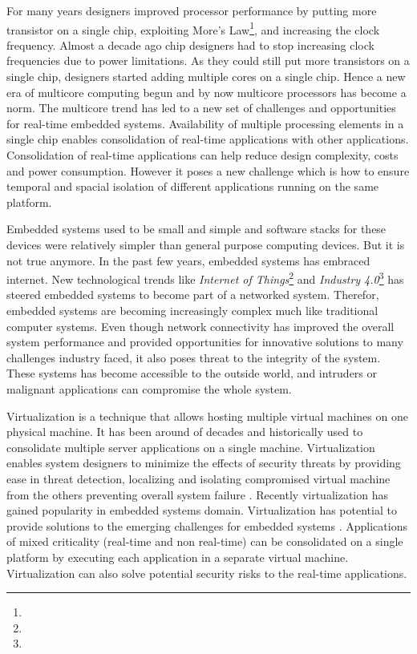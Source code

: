 For many years designers improved processor performance by putting more transistor on a single chip, exploiting More's Law\footnote{\moreslaw}, and increasing the clock frequency.
Almost a decade ago chip designers had to stop increasing clock frequencies due to power limitations.
As they could still put more transistors on a single chip, designers started adding multiple cores on a single chip.
Hence a new era of multicore computing begun and by now multicore processors has become a norm.
The multicore trend has led to a new set of challenges and opportunities for real-time embedded systems.
Availability of multiple processing elements in a single chip enables consolidation of real-time applications with other applications.
Consolidation of real-time applications can help reduce design complexity, costs and power consumption.
However it poses a new challenge which is how to ensure temporal and spacial isolation of different applications running on the same platform.

Embedded systems used to be small and simple and software stacks for these devices were relatively simpler
than general purpose computing devices. But it is not true anymore.
In the past few years, embedded systems has embraced internet. New technological trends like \emph{Internet of Things}\footnote{\IoT} and \emph{Industry 4.0}\footnote{\industry}
has steered embedded systems to become part of a networked system.
Therefor, embedded systems are becoming increasingly complex much like traditional computer systems.
Even though network connectivity has improved the overall system performance and provided opportunities for innovative solutions to many challenges industry faced,
it also poses threat to the integrity of the system.
These systems has become accessible to the outside world, and intruders or malignant applications can compromise the whole system.

Virtualization is a technique that allows hosting multiple virtual machines on one physical machine. 
It has been around of decades and historically used to consolidate multiple server applications on a single machine.
Virtualization enables system designers to minimize the effects of security threats 
by providing ease in threat detection, localizing and isolating compromised virtual machine from the others preventing overall system failure \cite{Chen:2001:VBR:874075.876409}.
Recently virtualization has gained popularity in embedded systems domain.
Virtualization has potential to provide solutions to the emerging challenges for embedded systems \cite{Heiser:2008:RVE:1435458.1435461}.
Applications of mixed criticality (real-time and non real-time) can be consolidated on a single platform by executing each 
application in a separate virtual machine.
Virtualization can also solve potential security risks to the real-time applications.

